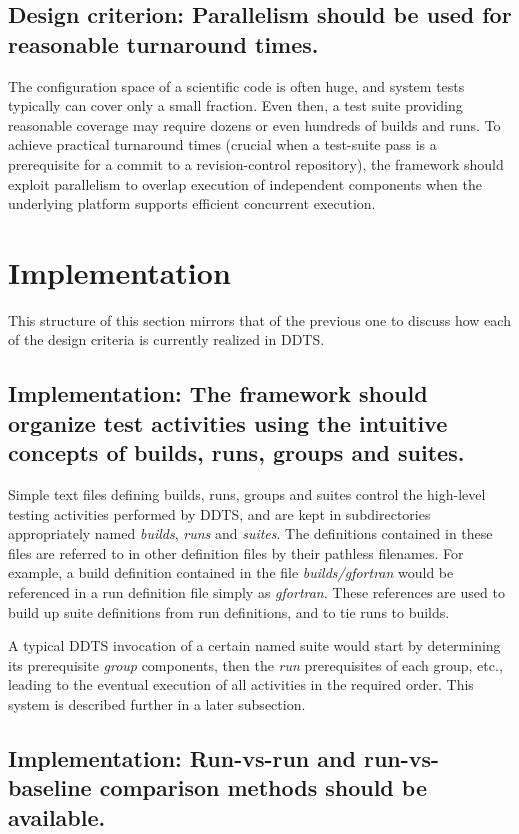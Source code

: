 \documentclass[conference]{IEEEtran}
\begin{document}
\subsection{Design criterion: Parallelism should be used for reasonable turnaround times.}

The configuration space of a scientific code is often huge, and system tests typically can cover only a small fraction. Even then, a test suite providing reasonable coverage may require dozens or even hundreds of builds and runs. To achieve practical turnaround times (crucial when a test-suite pass is a prerequisite for a commit to a revision-control repository), the framework should exploit parallelism to overlap execution of independent components when the underlying platform supports efficient concurrent execution.

\section{Implementation}

This structure of this section mirrors that of the previous one to discuss how each of the design criteria is currently realized in DDTS.

\subsection{Implementation: The framework should organize test activities using the intuitive concepts of builds, runs, groups and suites.}

Simple text files defining builds, runs, groups and suites control the high-level testing activities performed by DDTS, and are kept in subdirectories appropriately named \emph{builds}, \emph{runs} and \emph{suites}. The definitions contained in these files are referred to in other definition files by their pathless filenames. For example, a build definition contained in the file \emph{builds/gfortran} would be referenced in a run definition file simply as \emph{gfortran}. These references are used to build up suite definitions from run definitions, and to tie runs to builds.

A typical DDTS invocation of a certain named suite would start by determining its prerequisite \emph{group} components, then the \emph{run} prerequisites of each group, etc., leading to the eventual execution of all activities in the required order. This system is described further in a later subsection.

\subsection{Implementation: Run-vs-run and run-vs-baseline comparison methods should be available.}
\end{document}
